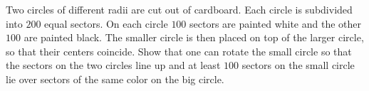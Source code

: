 Two circles of different radii are cut out of cardboard. Each circle is subdivided into $200$ equal sectors. On each circle $100$ sectors are painted white and the other $100$ are painted black. The smaller circle is then placed on top of the larger circle, so that their centers coincide. Show that one can rotate the small circle so that the sectors on the two circles line up and at least $100$ sectors on the small circle lie over sectors of the same color on the big circle.